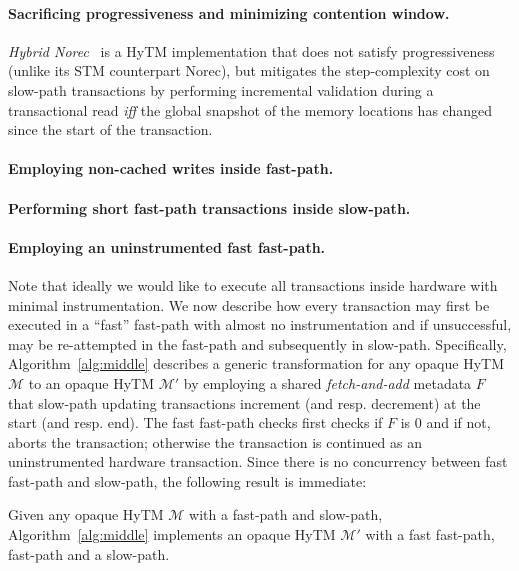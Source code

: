 \paragraph{Sacrificing progressiveness and minimizing contention window.}
%
\emph{Hybrid Norec}~\cite{hybridnorec} is a HyTM implementation that does not satisfy progressiveness
(unlike its STM counterpart Norec), but mitigates
the step-complexity cost on slow-path transactions by performing incremental validation during a transactional read \emph{iff} 
the global snapshot of the memory locations has changed since the start of the transaction.
%
%

\paragraph{Employing non-cached writes inside fast-path.}

\paragraph{Performing short fast-path transactions inside slow-path.}

\paragraph{Employing an uninstrumented fast fast-path.}
Note that ideally we would like to execute all transactions inside hardware with minimal instrumentation.
We now describe how every transaction may first be executed in a ``fast'' fast-path with almost no instrumentation
and if unsuccessful, may be re-attempted in the fast-path and subsequently in slow-path.
Specifically, Algorithm~\ref{alg:middle} describes a generic transformation for any opaque HyTM $\mathcal{M}$ to an opaque
HyTM $\mathcal{M}'$ by employing a shared \emph{fetch-and-add} metadata $F$ that slow-path updating transactions
increment (and resp. decrement) at the start (and resp. end). The fast fast-path checks first checks if $F$ is $0$
and if not, aborts the transaction; otherwise the transaction is continued as an uninstrumented hardware transaction.
Since there is no concurrency between fast fast-path and slow-path, the following result is immediate:
%
%
\begin{theorem}
Given any opaque HyTM $\mathcal{M}$ with a fast-path and slow-path, Algorithm~\ref{alg:middle} implements an opaque HyTM $\mathcal{M}'$
with a fast fast-path, fast-path and a slow-path.
\end{theorem}
%

%
